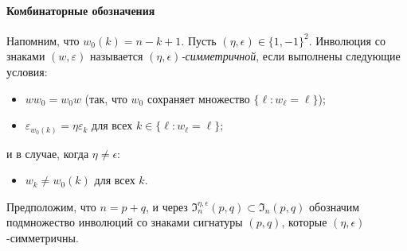 \documentclass{amsart}
\theoremstyle{definition}
\begin{document}
\medskip

\paragraph{\bf Комбинаторные обозначения}
Напомним, что $w_0(k)=n-k+1$.
Пусть $(\eta,\epsilon)\in\{1,-1\}^2$.
Инволюция со знаками $(w,\varepsilon)$ называется {\em $(\eta,\epsilon)$-симметричной}, если выполнены следующие условия:
\begin{itemize}
\item[(i)] $ww_0=w_0w$ (так, что  $w_0$ сохраняет множество $\{\ell:w_\ell=\ell\}$);
\item[(ii)] $\varepsilon_{w_0(k)}=\eta \varepsilon_k$ для всех $k\in\{\ell:w_\ell=\ell\}$;
\end{itemize}
и в случае, когда $\eta\not=\epsilon$:
\begin{itemize}
\item[(iii)]$w_k\not=w_0(k)$ для всех $k$.
\end{itemize}
Предположим, что $n=p+q$, и через $\mathfrak{I}_n^{\eta,\epsilon}(p,q)\subset\mathfrak{I}_n(p,q)$ обозначим подмножество инволюций со знаками сигнатуры $(p,q)$, которые $(\eta,\epsilon)$-симметричны.
\end{document}
